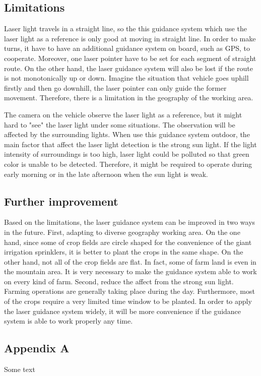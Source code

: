\documentclass[letterpaper,12pt,oneside]{book}
\begin{document}
		
		\section{Limitations}
		Laser light travels in a straight line, so the this guidance system which use the laser light as a reference is only good at moving in straight line. In order to make turns, it have to have an additional guidance system on board, such as GPS, to cooperate. Moreover, one laser pointer have to be set for each segment of straight route. On the other hand, the laser guidance system will also be lost if the route is not monotonically up or down. Imagine the situation that vehicle goes uphill firstly and then go downhill, the laser pointer can only guide the former movement. Therefore, there is a limitation in the geography of the working area.
		
		The camera on the vehicle observe the laser light as a reference, but it might hard to "see" the laser light under some situations. The observation will be affected by the surrounding lights. When use this guidance system outdoor, the main factor that affect the laser light detection is the strong sun light. If the light intensity of surroundings is too high, laser light could be polluted so that green color is unable to be detected. Therefore, it might be required to operate during early morning or in the late afternoon when the sun light is weak. 
		
		\section{Further improvement}
		Based on the limitations, the laser guidance system can be improved in two ways in the future. First, adapting to diverse geography working area. On the one hand, since some of crop fields are circle shaped for the convenience of the giant irrigation sprinklers, it is better to plant the crops in the same shape. On the other hand, not all of the crop fields are flat. In fact, some of farm land is even in the mountain area. It is very necessary to make the guidance system able to work on every kind of farm. Second, reduce the affect from the strong sun light. Farming operations are generally taking place during the day. Furthermore, most of the crops require a very limited time window to be planted. In order to apply the laser guidance system widely, it will be more convenience if the guidance system is able to work properly any time. 
		
		
		
		
		\backmatter
		\begin{appendices}
			\appendixpage
			\noappendicestocpagenum
			\addappheadtotoc
			
			\chapter{Appendix A}
			Some text
		\end{appendices}
\end{document}
